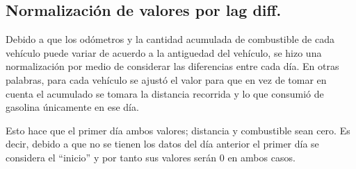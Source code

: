 \documentclass[]{article}
\newenvironment{Shaded}{\begin{snugshade}}{\end{snugshade}}
\newcommand{\KeywordTok}[1]{\textcolor[rgb]{0.13,0.29,0.53}{\textbf{#1}}}
\newcommand{\DataTypeTok}[1]{\textcolor[rgb]{0.13,0.29,0.53}{#1}}
\newcommand{\StringTok}[1]{\textcolor[rgb]{0.31,0.60,0.02}{#1}}
\newcommand{\OperatorTok}[1]{\textcolor[rgb]{0.81,0.36,0.00}{\textbf{#1}}}
\newcommand{\NormalTok}[1]{#1}
\begin{document}
\begin{Shaded}
\end{Shaded}

\subsection{Normalización de valores por lag
diff.}\label{normalizacion-de-valores-por-lag-diff.}

Debido a que los odómetros y la cantidad acumulada de combustible de
cada vehículo puede variar de acuerdo a la antiguedad del vehículo, se
hizo una normalización por medio de considerar las diferencias entre
cada día. En otras palabras, para cada vehículo se ajustó el valor para
que en vez de tomar en cuenta el acumulado se tomara la distancia
recorrida y lo que consumió de gasolina únicamente en ese día.

Esto hace que el primer día ambos valores; distancia y combustible sean
cero. Es decir, debido a que no se tienen los datos del día anterior el
primer día se considera el ``inicio'' y por tanto sus valores serán 0 en
ambos casos.
\end{document}
